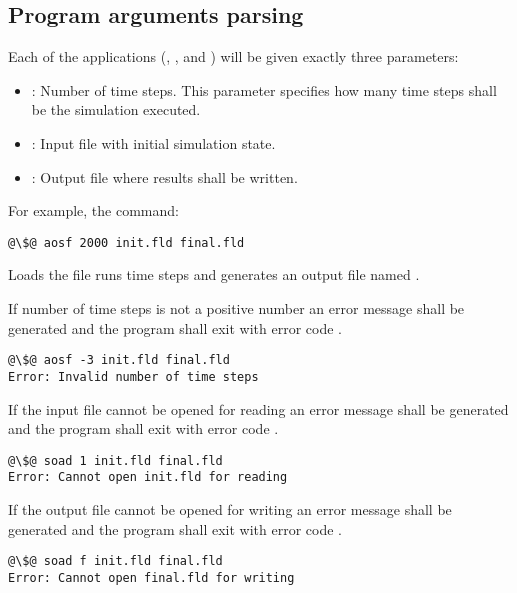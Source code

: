 \subsection{Program arguments parsing}

Each of the applications (, ,  and
) will be given exactly three parameters:

\begin{itemize}
\item {}: Number of time steps. This parameter specifies how many
time steps shall be the simulation executed.
\item {}: Input file with initial simulation state.
\item {}: Output file where results shall be written.
\end{itemize}

For example, the command:

\begin{lstlisting}[style=terminal,escapechar=@]
@\$@ aosf 2000 init.fld final.fld
\end{lstlisting}

Loads the file  runs  time steps and generates an
output file named .

If number of time steps is not a positive number an error message shall be
generated and the program shall exit with error code .

\begin{lstlisting}[style=terminal,escapechar=@]
@\$@ aosf -3 init.fld final.fld
Error: Invalid number of time steps
\end{lstlisting}

If the input file cannot be opened for reading an error message shall be
generated and the program shall exit with error code .

\begin{lstlisting}[style=terminal,escapechar=@]
@\$@ soad 1 init.fld final.fld
Error: Cannot open init.fld for reading
\end{lstlisting}

If the output file cannot be opened for writing an error message shall be
generated and the program shall exit with error code .

\begin{lstlisting}[style=terminal,escapechar=@]
@\$@ soad f init.fld final.fld
Error: Cannot open final.fld for writing
\end{lstlisting}
